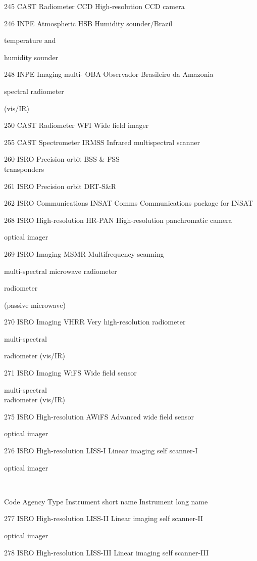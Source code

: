245 CAST Radiometer CCD High-resolution CCD camera

246 INPE Atmospheric HSB Humidity sounder/Brazil

temperature and

humidity sounder

248 INPE Imaging multi- OBA Observador Brasileiro da Amazonia

spectral radiometer

(vis/IR)

250 CAST Radiometer WFI Wide field imager

255 CAST Spectrometer IRMSS Infrared multispectral scanner

260 ISRO Precision orbit BSS \& FSS\\
transponders

261 ISRO Precision orbit DRT-S\&R

262 ISRO Communications INSAT Comms Communications package for INSAT

268 ISRO High-resolution HR-PAN High-resolution panchromatic camera

optical imager

269 ISRO Imaging MSMR Multifrequency scanning

multi-spectral microwave radiometer

radiometer

(passive microwave)

270 ISRO Imaging VHRR Very high-resolution radiometer

multi-spectral

radiometer (vis/IR)

271 ISRO Imaging WiFS Wide field sensor

multi-spectral\\
radiometer (vis/IR)

275 ISRO High-resolution AWiFS Advanced wide field sensor

optical imager

276 ISRO High-resolution LISS-I Linear imaging self scanner-I

optical imager

\textbf{\\
}

Code Agency Type Instrument short name Instrument long name

277 ISRO High-resolution LISS-II Linear imaging self scanner-II

optical imager

278 ISRO High-resolution LISS-III Linear imaging self scanner-III

